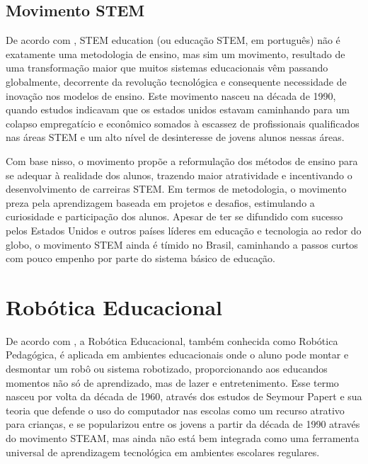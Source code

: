 \subsection{Movimento STEM}\label{sec:mov_stem}
De acordo com \cite{Pugliese}, STEM education (ou educação STEM, em português) não é exatamente uma metodologia de ensino, mas sim um movimento, resultado de uma transformação maior que muitos sistemas educacionais vêm passando globalmente, decorrente da revolução tecnológica e consequente necessidade de inovação nos modelos de ensino. Este movimento nasceu na década de 1990, quando estudos indicavam que os estados unidos estavam caminhando para um colapso empregatício e econômico somados à escassez de profissionais qualificados nas áreas STEM e um alto nível de desinteresse de jovens alunos nessas áreas. 

Com base nisso, o movimento propõe a reformulação dos métodos de ensino para se adequar à realidade dos alunos, trazendo maior atratividade e incentivando o desenvolvimento de carreiras STEM. Em termos de metodologia, o movimento preza pela aprendizagem baseada em projetos e desafios, estimulando a curiosidade e participação dos alunos. Apesar de ter se difundido com sucesso pelos Estados Unidos e outros países líderes em educação e tecnologia ao redor do globo, o movimento STEM ainda é tímido no Brasil, caminhando a passos curtos com pouco empenho por parte do sistema básico de educação. 

\section{Robótica Educacional}\label{sec:robot_educ}
De  acordo com \cite{nascimento}, a Robótica Educacional, também conhecida como Robótica Pedagógica, é aplicada em ambientes educacionais onde o aluno pode montar e desmontar um robô ou sistema robotizado, proporcionando aos educandos momentos não só de aprendizado, mas de lazer e entretenimento. Esse termo nasceu por volta da década de 1960, através dos estudos de Seymour Papert e sua teoria que defende o uso do computador nas escolas como um recurso atrativo para crianças, e se popularizou entre os jovens a partir da década de 1990 através do movimento STEAM, mas ainda não está bem integrada como uma ferramenta universal de aprendizagem tecnológica em ambientes escolares regulares.
 
